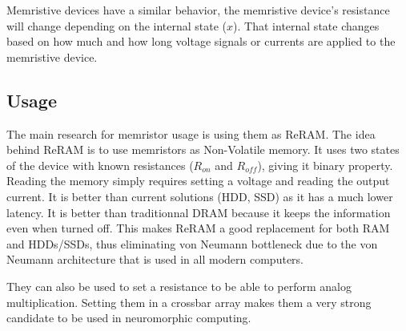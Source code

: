 Memristive devices have a similar behavior, the memristive device's resistance will change depending on the internal state ($x$). That internal state changes based on how much and how long voltage signals or currents are applied to the memristive device.

\subsection{Usage}
The main research for memristor usage is using them as ReRAM. The idea behind ReRAM is to use memristors as Non-Volatile memory. It uses two states of the device with known resistances ($R_{on}$ and $R_{off}$), giving it binary property. Reading the memory simply requires setting a voltage and reading the output current. It is better than current solutions (HDD, SSD) as it has a much lower latency. It is better than traditionnal DRAM because it keeps the information even when turned off. This makes ReRAM a good replacement for both RAM and HDDs/SSDs, thus eliminating von Neumann bottleneck due to the von Neumann architecture that is used in all modern computers.

They can also be used to set a resistance to be able to perform analog multiplication. Setting them in a crossbar array makes them a very strong candidate to be used in neuromorphic computing.
